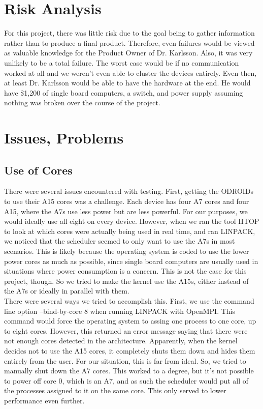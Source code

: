 \section{Risk Analysis}

For this project, there was little risk due to the goal being to gather information rather than to produce a final product. Therefore, even failures would be viewed as valuable knowledge for the Product Owner of Dr. Karlsson. Also, it was very unlikely to be a total failure. The worst case would be if no communication worked at all and we weren't even able to cluster the devices entirely. Even then, at least Dr. Karlsson would be able to have the hardware at the end. He would have \$1,200 of single board computers, a switch, and power supply assuming nothing was broken over the course of the project.

\section{Issues, Problems}

\subsection{Use of Cores}

There were several issues encountered with testing. First, getting the ODROIDs to use their A15 cores was a challenge. Each device has four A7 cores and four A15, where the A7s use less power but are less powerful. For our purposes, we would ideally use all eight on every device. However, when we ran the tool HTOP to look at which cores were actually being used in real time, and ran LINPACK, we noticed that the scheduler seemed to only want to use the A7s in most scenarios. This is likely because the operating system is coded to use the lower power cores as much as possible, since single board computers are usually used in situations where power consumption is a concern. This is not the case for this project, though. So we tried to make the kernel use the A15s, either instead of the A7s or ideally in parallel with them. \\

There were several ways we tried to accomplish this. First, we use the command line option --bind-by-core 8 when running LINPACK with OpenMPI. This command would force the operating system to assing one process to one core, up to eight cores. However, this returned an error message saying that there were not enough cores detected in the architecture. Apparently, when the kernel decides not to use the A15 cores, it completely shuts them down and hides them entirely from the user. For our situation, this is far from ideal. So, we tried to manually shut down the A7 cores. This worked to a degree, but it's not possible to power off core 0, which is an A7, and as such the scheduler would put all of the processes assigned to it on the same core. This only served to lower performance even further. \\

